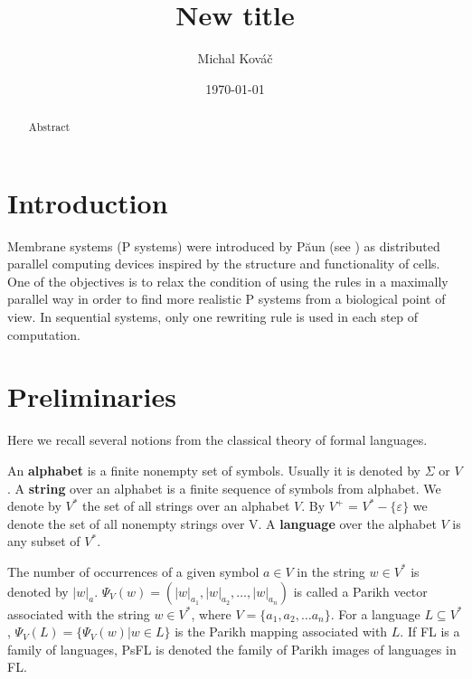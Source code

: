 \documentclass[llncs,submission,copyright,creativecommons]{../lib/lncs/llncs}
\def\eps{\varepsilon}
\begin{document}
\title{New title}
\author{Michal Kováč}
\date{\today}
\maketitle

\begin{abstract}
Abstract
\end{abstract}

\section{Introduction}
\label{sec:introduction}


Membrane systems (P systems) were introduced by P\u{a}un (see \cite{Paun2000108}) as distributed parallel computing devices inspired by the structure and functionality of cells.
One of the objectives is to relax the condition of using the rules in a maximally parallel way in order to find more realistic P systems from a biological point of view.
In sequential systems, only one rewriting rule is used in each step of computation.


\section{Preliminaries}
\label{sec:preliminaries}

Here we recall several notions from the classical theory of formal languages.

An {\bf alphabet} is a finite nonempty set of symbols. Usually it is denoted by $\Sigma$ or $V$. A {\bf string} over an alphabet is a finite sequence of symbols from alphabet. We denote by $V^*$ the set of all strings over an alphabet $V$. By $V^+$ = $V^* - \{\eps\}$ we denote the set of all nonempty strings over V. A {\bf language} over the alphabet $V$ is any subset of $V^*$.

The number of occurrences of a given symbol $a\in V$ in the string $w\in V^*$ is denoted by $|w|_a$. $\Psi_V(w)=(|w|_{a_1},|w|_{a_2},\dots,|w|_{a_n})$ is called a Parikh vector associated with the string $w\in V^*$, where $V=\{a_1,a_2,\dots a_n\}$. For a language $L\subseteq V^*$, $\Psi_V(L)=\{\Psi_V(w)|w\in L\}$ is the Parikh mapping associated with $L$. If FL is a family of languages, PsFL is denoted the family of Parikh images of languages in FL.
\end{document}
